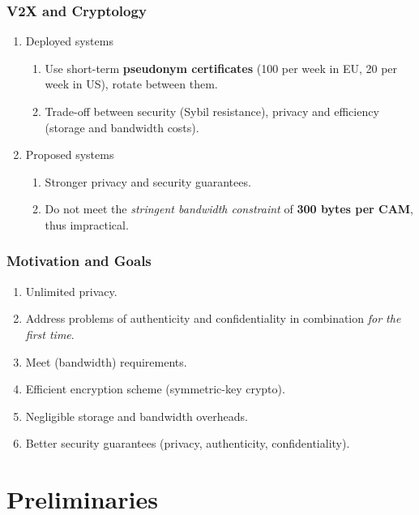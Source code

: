 \documentclass{beamer}
\begin{document}
    \begin{frame}
        \frametitle{V2X and Cryptology}
        \begin{enumerate}
            \item Deployed systems
            \begin{enumerate}
                \item Use short-term \textbf{pseudonym certificates} (100 per
                week in EU, 20 per week in US), rotate between them.
                \item Trade-off between security (Sybil resistance), privacy and
                efficiency (storage and bandwidth costs).
            \end{enumerate}
            \pause
            \item Proposed systems
            \begin{enumerate}
                \item Stronger privacy and security guarantees.
                \item Do not meet the \emph{stringent bandwidth constraint} of
                \textbf{300 bytes per CAM}, thus impractical.
            \end{enumerate}
        \end{enumerate}
    \end{frame}

    \begin{frame}
        \frametitle{Motivation and Goals}
        \begin{enumerate}
            \item Unlimited privacy.
            \item Address problems of authenticity and confidentiality in
            combination \emph{for the first time}.
            \item Meet (bandwidth) requirements.
            \item Efficient encryption scheme (symmetric-key crypto).
            \item Negligible storage and bandwidth overheads.
            \item Better security guarantees (privacy, authenticity,
            confidentiality).
        \end{enumerate}
    \end{frame}

    \section{Preliminaries}
\end{document}
